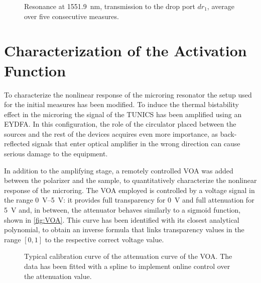 \begin{figure}[!hbtp]
	\centering
	
	\caption{
		Resonance at \SI{1551.9}{\nm}, transmission to the drop port $dr_1$, average over five consecutive measures.
	}
	\label{fig:M3_1550_resonance}
\end{figure}

\section{Characterization of the Activation Function}
\label{sec:Characterization_of_the_Activation_Function}
To characterize the nonlinear response of the microring resonator the setup used for the initial measures has been modified.
To induce the thermal bistability effect in the microring the signal of the TUNICS has been amplified using an \ac{EYDFA}.
In this configuration, the role of the circulator placed between the sources and the rest of the devices acquires even more importance, as back-reflected signals that enter optical amplifier in the wrong direction can cause serious damage to the equipment.

In addition to the amplifying stage, a remotely controlled \ac{VOA} was added between the polarizer and the sample, to quantitatively characterize the nonlinear response of the microring. %
The \ac{VOA} employed is controlled by a voltage signal in the range \SIrange{0}{5}{\V}: it provides full transparency for \SI{0}{\V} and full attenuation for \SI{5}{\V} and, in between, the attenuator behaves similarly to a sigmoid function, shown in \autoref{fig:VOA}.
This curve has been identified with its closest analytical polynomial, to obtain an inverse formula that links transparency values in the range $[0,1]$ to the respective correct voltage value.

\begin{figure}[htbp]
	\centering
	
	\caption{Typical calibration curve of the attenuation curve of the VOA.
		The data has been fitted with a spline to implement online control over the attenuation value.
	}
	\label{fig:VOA}
\end{figure}%

